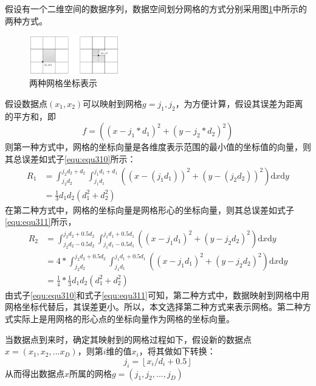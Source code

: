 假设有一个二维空间的数据序列，数据空间划分网格的方式分别采用图\ref{fig:fig34}中所示的两种方式。

\begin{figure}[htb]
	\centering
	\includegraphics[width=0.35\textwidth]{figures/figure3x4}
	\caption{两种网格坐标表示}\label{fig:fig34}
\end{figure}

假设数据点$(x_1, x_2)$可以映射到网格$g={j_1, j_2}$，为方便计算，假设其误差为距离的平方和，即
\begin{equation}
f = \left ( (x-j_1*d_1)^2 + (y - j_2* d_2)^2 \right )
\end{equation}
则第一种方式中，网格的坐标向量是各维度表示范围的最小值的坐标值的向量，则其总误差如式子\ref{equ:equ310}所示：
\begin{equation}\label{equ:equ310}
\begin{split}
R_1 &= \int_{j_2d_2}^{j_2d_2 + d_2}\int_{j_1d_1}^{j_1d_1 + d_1}((x - (j_1d_1))^{2} + (y - (j_2d_2))^2){\mathrm{d} x}{\mathrm{d} y}\\
 &= \frac{1}{3}d_{1}d_{2}\left ( d_1^2 + d_2^2 \right )
\end{split}
\end{equation}
在第二种方式中，网格的坐标向量是网格形心的坐标向量，则其总误差如式子\ref{equ:equ311}所示，
\begin{equation}\label{equ:equ311}
\begin{split}
R_2 &=\int_{j_2d_2 -0.5d_2}^{j_2d_2+0.5d_2}\int_{j_1d_1-0.5d_1}^{j_1d_1+0.5d_1}((x-j_1d_1)^2+(y-j_2d_2)^2){\mathrm{d} x}{\mathrm{d} y} \\
 &= 4 * \int_{j_2d_2}^{j_2d_2+0.5d_2}\int_{j_1d_1}^{j_1d_1+0.5d_1}((x-j_1d_1)^2+(y-j_2d_2)^2){\mathrm{d} x}{\mathrm{d} y} \\
 &= \frac{1}{4}\ast \frac{1}{3}d_{1}d_{2}\left ( d_1^2 + d_2^2 \right )
\end{split}
\end{equation}
由式子\ref{equ:equ310}和式子\ref{equ:equ311}可知，第二种方式中，数据映射到网格中用网格坐标代替后，其误差更小。所以，本文选择第二种方式来表示网格。第二种方式实际上是用网格的形心点的坐标向量作为网格的坐标向量。

当数据点到来时，确定其映射到的网格过程如下，假设新的数据点$x = (x_1, x_2, ... x_D)$，则第$i$维的值$x_i$，将其做如下转换：
\begin{equation}
	j_i = \left \lfloor x_i / d_i + 0.5 \right \rfloor
\end{equation}
从而得出数据点$x$所属的网格$g = (j_1, j_2, ... , j_D)$

